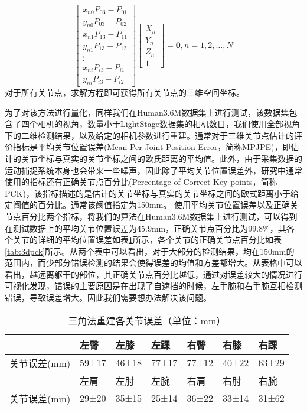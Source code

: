 \begin{equation}
    \left[ \begin{array}{c}
            x_{n0}P_{03} - P_{01} \\
            y_{n0}P_{03} - P_{02} \\
            x_{n1}P_{13} - P_{11} \\
            y_{n1}P_{13} - P_{12} \\
            \vdots                \\
            x_{ni}P_{i3} - P_{i1} \\
            y_{ni}P_{i3} - P_{i2}
        \end{array}\right] \left[ \begin{array}{c}
            X_n \\
            Y_n \\
            Z_n \\
            1
        \end{array}\right]  = \bm{0}, n = 1,2,\ldots,N
\end{equation}
对于所有关节点，求解方程即可获得所有关节点的三维空间坐标。

为了对该方法进行量化，同样我们在Human3.6M数据集上进行测试，该数据集包含了四个相机的视角，数量小于LightStage数据集的相机数目，我们使用全部视角下的二维检测结果，以及给定的相机参数进行重建。通常对于三维关节点估计的评价指标是平均关节位置误差(Mean Per Joint Position Error，简称MPJPE)，即估计的关节坐标与真实的关节坐标之间的欧氏距离的平均值。此外，由于采集数据的运动捕捉系统本身也会带来一些噪声，因此除了平均关节位置误差外，研究中通常使用的指标还有正确关节点百分比(Percentage of Correct Key-points，简称PCK)，该指标描述的是估计的关节坐标与真实的关节坐标之间的欧式距离小于给定阈值的百分比。通常该阈值指定为150mm。
使用平均关节位置误差以及正确关节点百分比两个指标，将我们的算法在Human3.6M数据集上进行测试，可以得到在测试数据上的平均关节位置误差为45.9mm，正确关节点百分比为99.8\%，其各个关节的详细的平均位置误差如表\ref{tab:3derrorjoint}所示，各个关节的正确关节点百分比如表\ref{tab:3dpck}所示。从两个表中可以看出，对于大部分的检测结果，均在150mm的范围内，而少部分错误检测的结果会使得误差的均值和方差都增大。从表格中可以看出，越远离躯干的部位，其正确关节点百分比越低，通过对误差较大的情况进行可视化发现，错误的主要原因是在出现了自遮挡的时候，左手腕和右手腕互相检测错误，导致误差增大。因此我们需要想办法解决该问题。

\begin{table}[H]
    \centering
    \begin{tabular}{lllllll}
        \hline
                      & 左臀   & 左膝   & 左踝   & 右臀   & 右膝   & 右踝   \\
        \hline
         关节误差(mm) & 59±17  & 46±18  & 77±17  & 77±12  & 40±22  & 63±29  \\
                      & 左肩   & 左肘   & 左腕   & 右肩   & 右肘   & 右腕   \\
         关节误差(mm) & 29±20  & 35±15  & 25±14  & 36±22  & 33±14  & 31±62  \\
        \hline
        \end{tabular}
    \caption{三角法重建各关节误差（单位：mm）\label{tab:3derrorjoint}}
\end{table} 

